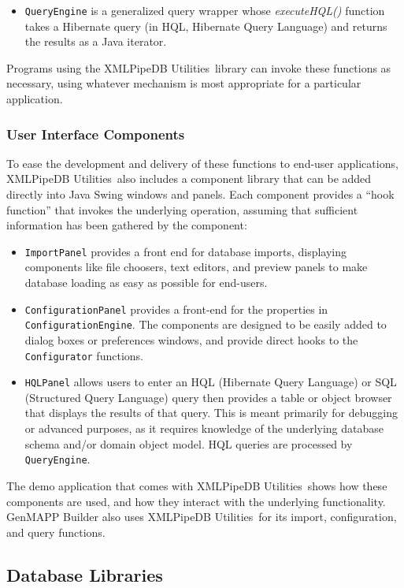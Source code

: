 \documentclass[10pt]{bmc_article}
\newenvironment{bmcformat}{\begin{raggedright}\baselineskip20pt\sloppy\setboolean{publ}{false}}{\end{raggedright}\baselineskip20pt\sloppy}
\def\xpdutils{XMLPipeDB Utilities}
\begin{document}
\begin{bmcformat}
\begin{itemize}
\item \texttt{QueryEngine} is a generalized query wrapper whose \emph{executeHQL()} function takes a Hibernate query (in HQL, Hibernate Query Language) and returns the results as a Java iterator.
\end{itemize}
Programs using the \xpdutils\ library can invoke these functions as necessary, using whatever mechanism is most appropriate for a particular application.\pb

\subsubsection*{User Interface Components}

To ease the development and delivery of these functions to end-user applications, \xpdutils\ also includes a component library that can be added directly into Java Swing windows and panels.  Each component provides a ``hook function'' that invokes the underlying operation, assuming that sufficient information has been gathered by the component:
\begin{itemize}
\item \texttt{ImportPanel} provides a front end for database imports, displaying components like file choosers, text editors, and preview panels to make database loading as easy as possible for end-users.

\item \texttt{ConfigurationPanel} provides a front-end for the properties in \texttt{ConfigurationEngine}.  The components are designed to be easily added to dialog boxes or preferences windows, and provide direct hooks to the \texttt{Configurator} functions.

\item \texttt{HQLPanel} allows users to enter an HQL (Hibernate Query Language) or SQL (Structured Query Language) query then provides a table or object browser that displays the results of that query.  This is meant primarily for debugging or advanced purposes, as it requires knowledge of the underlying database schema and/or domain object model.  HQL queries are processed by \texttt{QueryEngine}.
\end{itemize}
The demo application that comes with \xpdutils\ shows how these components are used, and how they interact with the underlying functionality.  GenMAPP Builder also uses \xpdutils\ for its import, configuration, and query functions.\pb

\subsection*{Database Libraries}


\end{bmcformat}
\end{document}
